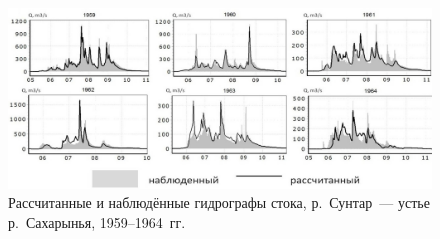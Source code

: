 \begin{figure}[h!]
  \begin{center}
    \includegraphics[width=1\textwidth]{authors/nesterova-1-fig-2.jpg}
  \end{center}
\vspace{-10pt}
  \caption{Рассчитанные и наблюдённые гидрографы стока, р.~Сунтар~--- устье
р.~Сахарынья, 1959--1964~гг.}
  \label{fig:nesterova-1-fig-2}
\vspace{-10pt}
\end{figure}
